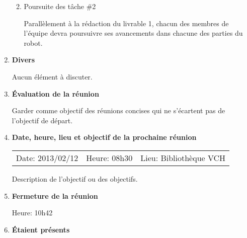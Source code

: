 \documentclass[12pt]{ULojpv}
\begin{document}
\begin{enumerate}
\begin{enumerate}
\begin{enumerate}
\end{enumerate}

\item Poursuite des tâche \#2

Parallèlement à la rédaction du livrable 1, chacun des membres de l'équipe devra poursuivre ses avancements dans chacune des parties du robot.

\end{enumerate}





\item \textbf{Divers}

Aucun élément à discuter.



\item \textbf{Évaluation de la réunion}

Garder comme objectif des réunions concises qui ne s'écartent pas de l'objectif de départ.

\item \textbf{Date, heure, lieu et objectif de la prochaine réunion}

\begin{tabular}{@{}lll}
   Date: 2013/02/12
   & Heure: 08h30
   &  Lieu: Bibliothèque VCH
\end{tabular}
\par
Description de l'objectif ou des objectifs.

\item \textbf{Fermeture de la réunion}

Heure: 10h42


\item \textbf{Étaient présents}


\end{enumerate}
\end{document}
